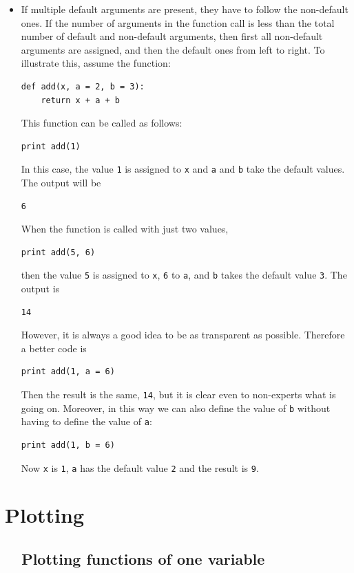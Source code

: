 \begin{itemize}
\begin{verbatim}
\end{verbatim}
\item If multiple default arguments are present, they have to follow the non-default ones.
      If the number of arguments in the function call is less than the total number of default and non-default
      arguments, then first all non-default arguments are assigned, and then the default ones from 
      left to right. To illustrate this, assume the function:
\begin{verbatim}
def add(x, a = 2, b = 3):
    return x + a + b
\end{verbatim}
This function can be called as follows:
\begin{verbatim}
print add(1)
\end{verbatim}
In this case, the value {\tt 1} is assigned to {\tt x} and {\tt a} and {\tt b} take the default values.
The output will be 
\begin{verbatim}
6
\end{verbatim}
When the function is called with just two values,
\begin{verbatim}
print add(5, 6)
\end{verbatim}
then the value {\tt 5} is assigned to {\tt x}, {\tt 6} to {\tt a}, and {\tt b} takes the default value {\tt 3}.
The output is
\begin{verbatim}
14
\end{verbatim}
However, it is always a good idea to be as transparent as possible. Therefore a better code is 
\begin{verbatim}
print add(1, a = 6)
\end{verbatim}
Then the result is the same, {\tt 14}, but it is clear even to non-experts what is going on. Moreover,
in this way we can also define the value of {\tt b} without having to define the value of {\tt a}:
\begin{verbatim}
print add(1, b = 6)
\end{verbatim}
Now {\tt x} is {\tt 1}, {\tt a} has the default value {\tt 2} and the result is {\tt 9}.
\end{itemize}


\section{Plotting} \label{sec:plotting}

\subsection{\ \ Plotting functions of one variable}\label{plotting}

